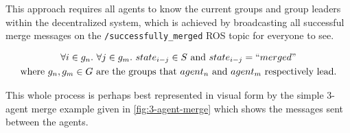 This approach requires all agents to know the current groups and group leaders within the decentralized system, which is achieved by broadcasting all successful merge messages on the \texttt{/successfully\_merged} ROS topic for everyone to see.

\begin{equation}
    \begin{gathered} \label{eq:state-update-equation}
        \forall i \in g_n. \ \forall j \in g_m. \ state_{i-j} \in S \text{ and } state_{i-j} = ``merged" \\ \text{where $g_n, g_m \in G$ are the groups that $agent_n$ and $agent_m$ respectively lead.}
    \end{gathered}
\end{equation}

This whole process is perhaps best represented in visual form by the simple 3-agent merge example given in \autoref{fig:3-agent-merge} which shows the messages sent between the agents.

